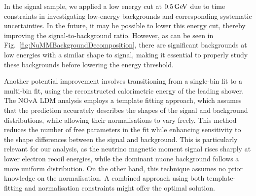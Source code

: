In the signal sample, we applied a low energy cut at $\unit[0.5]{GeV}$ due to time constraints in investigating low-energy backgrounds and corresponding systematic uncertainties. In the future, it may be possible to lower this energy cut, thereby improving the signal-to-background ratio. However, as can be seen in Fig.~\ref{fig:NuMMBackgroundDecomposition}, there are significant backgrounds at low energies with a similar shape to signal, making it essential to properly study these backgrounds before lowering the energy threshold.

Another potential improvement involves transitioning from a single-bin fit to a multi-bin fit, using the reconstructed calorimetric energy of the leading shower. The \gls{NOvA} \gls{LDM} analysis \cite{NOVA-doc-59439} employs a template fitting approach, which assumes that the prediction accurately describes the shapes of the signal and background distributions, while allowing their normalisations to vary freely. This method reduces the number of free parameters in the fit while enhancing sensitivity to the shape differences between the signal and background. This is particularly relevant for our analysis, as the neutrino magnetic moment signal rises sharply at lower electron recoil energies, while the dominant \gls{nuone} background follows a more uniform distribution. On the other hand, this technique assumes no prior knowledge on the normalisation. A combined approach using both template-fitting and normalisation constraints might offer the optimal solution.


